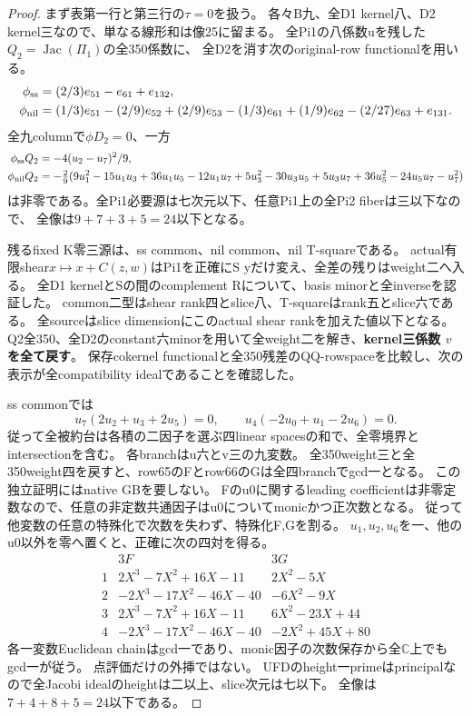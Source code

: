 \documentclass[a4paper,11pt]{ltjsarticle}
\theoremstyle{definition}
\begin{document}
\begin{proof}
まず表第一行と第三行の$\tau=0$を扱う。
各々B九、全D1 kernel八、D2 kernel三なので、単なる線形和は像25に留まる。
全Pi1の八係数uを残した$Q_2=\operatorname{Jac}(\Pi_1)$の全350係数に、
全D2を消す次のoriginal-row functionalを用いる。
\[
\begin{aligned}
 \phi_{\rm ss}&=(2/3)e_{51}-e_{61}+e_{132},\\
 \phi_{\rm nil}&=(1/3)e_{51}-(2/9)e_{52}+(2/9)e_{53}-(1/3)e_{61}
                       +(1/9)e_{62}-(2/27)e_{63}+e_{131}.
\end{aligned}
\]
全九columnで$\phi D_2=0$、一方
\[
\begin{aligned}
 \phi_{\rm ss}Q_2&=-4(u_2-u_7)^2/9,\\
 \phi_{\rm nil}Q_2&=-\tfrac29(9u_1^2-15u_1u_3+36u_1u_5-12u_1u_7+5u_3^2-30u_3u_5
                   +5u_3u_7+36u_5^2-24u_5u_7-u_7^2)
\end{aligned}
\]
は非零である。全Pi1必要源は七次元以下、任意Pi1上の全Pi2 fiberは三以下なので、
全像は$9+7+3+5=24$以下となる。

残るfixed K零三源は、ss common、nil common、nil T-squareである。
actual有限shear$x\mapsto x+C(z,w)$はPi1を正確にS yだけ変え、全差の残りはweight二へ入る。
全D1 kernelとSの間のcomplement Rについて、basis minorと全inverseを認証した。
common二型はshear rank四とslice八、T-squareはrank五とslice六である。
全sourceはslice dimensionにこのactual shear rankを加えた値以下となる。
Q2全350、全D2のconstant六minorを用いて全weight二を解き、\textbf{kernel三係数 $v$ を全て戻す}。
保存cokernel functionalと全350残差のQQ-rowspaceを比較し、次の表示が全compatibility idealであることを確認した。

ss commonでは
\[
 u_7(2u_2+u_3+2u_5)=0,\qquad u_4(-2u_0+u_1-2u_6)=0.
\]
従って全被約台は各積の二因子を選ぶ四linear spacesの和で、全零境界とintersectionを含む。
各branchはu六とv三の九変数。
全350weight三と全350weight四を戻すと、row65のFとrow66のGは全四branchでgcd一となる。
この独立証明にはnative GBを要しない。
Fのu0に関するleading coefficientは非零定数なので、任意の非定数共通因子はu0についてmonicかつ正次数となる。
従って他変数の任意の特殊化で次数を失わず、特殊化F,Gを割る。
$u_1,u_2,u_6$を一、他のu0以外を零へ置くと、正確に次の四対を得る。
\[
\begin{array}{c|c|c}
 &3F&3G\\\hline
 1&2X^3-7X^2+16X-11&2X^2-5X\\
 2&-2X^3-17X^2-46X-40&-6X^2-9X\\
 3&2X^3-7X^2+16X-11&6X^2-23X+44\\
 4&-2X^3-17X^2-46X-40&-2X^2+45X+80
\end{array}
\]
各一変数Euclidean chainはgcd一であり、monic因子の次数保存から全$\mathbb C$上でもgcd一が従う。
点評価だけの外挿ではない。
UFDのheight一primeはprincipalなので全Jacobi idealのheightは二以上、slice次元は七以下。
全像は$7+4+8+5=24$以下である。


\end{proof}
\end{document}
